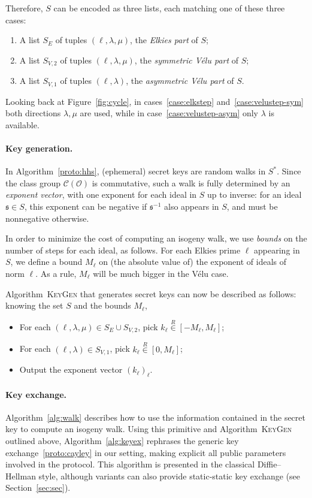 \documentclass{article}
\newcommand{\Cl}{\mathcal{C}}
\renewcommand{\O}{\mathcal{O}}
\newcommand{\algstyle}[1]{\textsc{#1}}
\renewcommand{\frak}{\mathfrak}
\newcommand{\rand}[1]{\overset{#1}{∈}}
\newcommand{\uni}{\rand{R}}
\theoremstyle{definition}
\begin{document}
Therefore, $S$ can be encoded as three lists, each matching one of these three cases:

\begin{enumerate}
\item A list $S_E$ of tuples $(\ell, \lambda, \mu)$, the \emph{Elkies part} of $S$;
\item A list $S_{V, 2}$ of tuples $(\ell, \lambda, \mu)$, the \emph{symmetric Vélu part} of $S$;
\item A list $S_{V, 1}$ of tuples $(\ell, \lambda)$, the \emph{asymmetric Vélu part} of $S$.
\end{enumerate}

Looking back at Figure~\ref{fig:cycle}, in cases~\ref{case:elkstep} and~\ref{case:velustep-sym}
both directions $\lambda,\mu$ are used, while in case~\ref{case:velustep-asym} only $\lambda$ is
available.

\paragraph{Key generation.}

In Algorithm~\ref{proto:hhs}, (ephemeral) secret keys are random walks
in $S^*$. Since the class group $\Cl(\O)$ is commutative, such a walk is fully
determined by an \emph{exponent vector}, with one exponent for each ideal in $S$
up to inverse: for an ideal $\frak s\in S$, this exponent can be negative if
$\frak s^{-1}$ also appears in $S$, and must be nonnegative otherwise.

In order to minimize the cost of computing an isogeny walk, we use \emph{bounds}
on the number of steps for each ideal, as follows.
For each Elkies prime $\ell$ appearing in $S$, we define a bound $M_\ell$
on (the absolute value of) the exponent of ideals of norm $\ell$. As a rule,
$M_\ell$ will be much bigger in the Vélu case.

Algorithm~\algstyle{KeyGen} that generates secret keys can now
be described as follows: knowing the set $S$ and the bounds $M_\ell$,
\begin{itemize}
\item For each $(\ell, \lambda, \mu)\in S_E\cup S_{V, 2}$, pick $k_\ell\uni [-M_\ell, M_\ell]$;
\item For each $(\ell, \lambda)\in S_{V, 1}$, pick $k_\ell\uni [0,M_\ell]$;
\item Output the exponent vector $(k_\ell)_\ell$.
\end{itemize}

\paragraph{Key exchange.} Algorithm~\ref{alg:walk} describes how to use the
information contained in the secret key to compute an isogeny walk. Using
this primitive and Algorithm~\algstyle{KeyGen} outlined above,
Algorithm~\ref{alg:keyex} rephrases the generic key exchange~\ref{proto:cayley}
in our setting, making explicit all public parameters involved in the
protocol. This algorithm is presented in the classical Diffie--Hellman style,
although variants can also provide static-static key exchange (see Section~\ref{sec:sec}).
\end{document}
